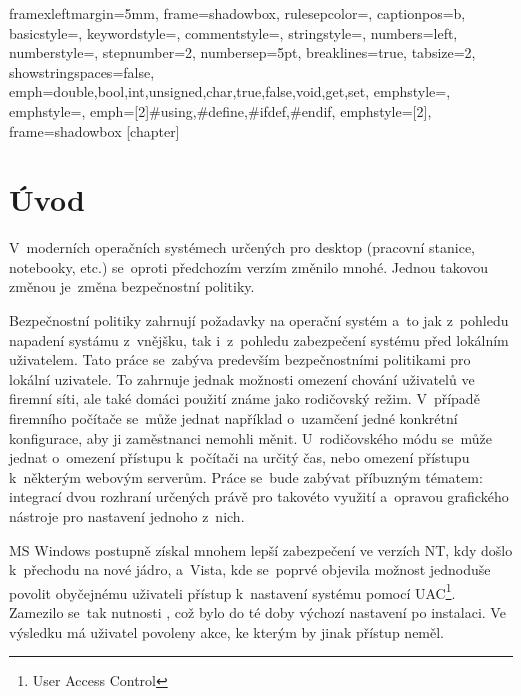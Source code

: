 \renewcommand*\lstlistingname{Výpis}
\setlength{\parskip}{3pt plus 1pt minus 1pt}
\lstset
{
framexleftmargin=5mm,
frame=shadowbox,
rulesepcolor=\color{blue},
captionpos=b,
basicstyle=\footnotesize\ttfamily,
keywordstyle=\color{blue},
commentstyle=\color{OliveGreen},
stringstyle=\color{Maroon},
numbers=left,
numberstyle=\scriptsize,
stepnumber=2,
numbersep=5pt,
breaklines=true,
tabsize=2,
showstringspaces=false,
emph={double,bool,int,unsigned,char,true,false,void,get,set},
emphstyle=\color{blue},
emphstyle=\color{red},
emph={[2]\#using,\#define,\#ifdef,\#endif},
emphstyle={[2]\color{blue}},
frame=shadowbox
}
[chapter]
\newcommand{\cppc}[1]{\lstinline[language=C++]$#1$}

\chapter{Úvod}
V~moderních operačních systémech určených pro desktop (pracovní stanice, notebooky, etc.) se~oproti předchozím verzím změnilo mnohé. Jednou takovou změnou je~změna bezpečnostní politiky.

Bezpečnostní politiky zahrnují požadavky na operační systém a~to jak z~pohledu napadení systámu z~vnějšku, tak i~z~pohledu zabezpečení systému před lokálním uživatelem. Tato práce se~zabýva predevším bezpečnostními politikami pro lokální uzivatele. To zahrnuje jednak možnosti omezení chování uživatelů ve firemní síti, ale také domáci použití známe jako rodičovský režim.
V~případě firemního počítače se~může jednat například o~uzamčení jedné konkrétní konfigurace, aby ji zaměstnanci nemohli měnit. U~rodičovského módu se~může jednat o~omezení přístupu k~počítači na určitý čas, nebo omezení přístupu k~některým webovým serverům. Práce se~bude zabývat příbuzným tématem: integrací dvou rozhraní určených právě pro takovéto využití a~opravou grafického nástroje pro nastavení jednoho z~nich.


MS Windows postupně získal mnohem lepší zabezpečení ve verzích NT, kdy došlo k~přechodu na nové jádro, a~Vista, kde se~poprvé objevila možnost jednoduše povolit obyčejnému uživateli přístup k~nastavení systému pomocí UAC\footnote{User Access Control}. Zamezilo se~tak nutnosti , což bylo do té doby výchozí nastavení po instalaci. Ve výsledku má uživatel povoleny akce, ke kterým by jinak přístup neměl.

